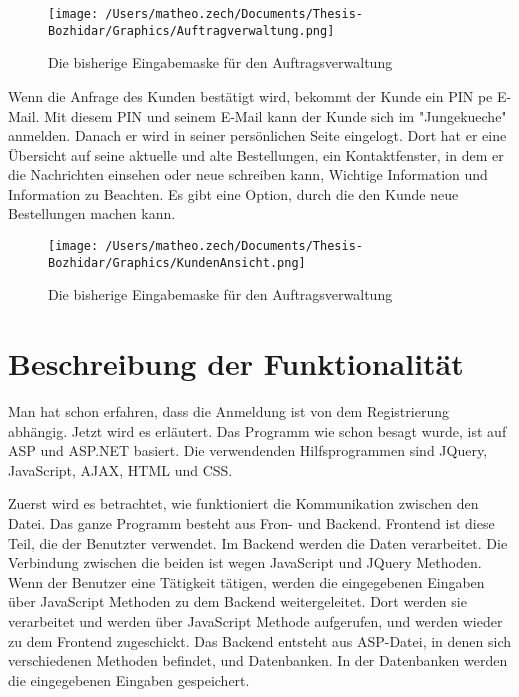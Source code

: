 \begin{figure}[h]
	\centering
	\texttt{[image: /Users/matheo.zech/Documents/Thesis-Bozhidar/Graphics/Auftragverwaltung.png]}
	\caption[Auftragsverwaltung]{Die bisherige Eingabemaske für den Auftragsverwaltung}
	\label{fig:Auftragverwaltung}
\end{figure}

Wenn die Anfrage des Kunden bestätigt wird, bekommt der Kunde ein PIN pe E-Mail. Mit diesem PIN und seinem E-Mail kann der Kunde sich im "Jungekueche" anmelden. Danach er wird in seiner persönlichen Seite eingelogt. Dort hat er eine Übersicht auf seine aktuelle und alte Bestellungen, ein Kontaktfenster, in dem er die Nachrichten einsehen oder neue schreiben kann, Wichtige Information und Information zu Beachten. Es gibt eine Option, durch die den Kunde neue Bestellungen machen kann.  

\begin{figure}[h]
	\centering
	\texttt{[image: /Users/matheo.zech/Documents/Thesis-Bozhidar/Graphics/KundenAnsicht.png]}
	\caption[Kundeansicht]{Die bisherige Eingabemaske für den Auftragsverwaltung}
	\label{fig:KundenAnsicht}
\end{figure}

\section{Beschreibung der Funktionalität}   

Man hat schon erfahren, dass die Anmeldung ist von dem Registrierung abhängig. Jetzt wird es erläutert. Das Programm wie schon besagt wurde, ist auf ASP und ASP.NET basiert. Die verwendenden Hilfsprogrammen sind JQuery, JavaScript, AJAX, HTML und CSS. 

Zuerst wird es betrachtet, wie funktioniert die Kommunikation zwischen den Datei. Das ganze Programm besteht aus Fron- und Backend. Frontend ist diese Teil, die der Benutzter verwendet. Im Backend werden die Daten verarbeitet. Die Verbindung zwischen die beiden ist wegen JavaScript und JQuery  Methoden. Wenn der Benutzer eine Tätigkeit tätigen, werden die eingegebenen Eingaben über JavaScript Methoden zu dem Backend weitergeleitet. Dort werden sie verarbeitet und werden über JavaScript Methode aufgerufen, und werden wieder zu dem Frontend zugeschickt. Das Backend entsteht aus ASP-Datei, in denen sich verschiedenen Methoden befindet, und Datenbanken. In der Datenbanken werden die eingegebenen Eingaben gespeichert.    




